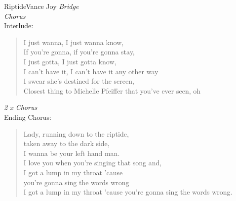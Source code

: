 \begin{song}{Riptide}{Vance Joy}
		\emph{Bridge} \\
		\emph{Chorus} \\
		Interlude: \\
		\begin{verse}
			I just wanna, I just wanna know,	\\
			If you're gonna, if you're gonna stay, \\
			I just gotta, I just gotta know, \\
			I can't have it, I can't have it any other way \\
			I swear she's destined for the sc\chord{C}reen,  \\
			Closest thing to Michelle Pfeiffer that you've ever seen, oh 
		\end{verse}
		
		\emph{2 x Chorus} \\
		Ending Chorus: \\
		\begin{verse}
			Lady, running down to the riptide, \\
			taken away to the dark side, \\
			I wanna be your left hand man. \\
			I love you when you're singing that song and, \\
			I got a lump in my throat 'cause \\
			you're gonna sing the words wrong \\ 
			I got a lump in my throat 'cause you're gonna sing the words wrong. 
		\end{verse}
	\end{song}